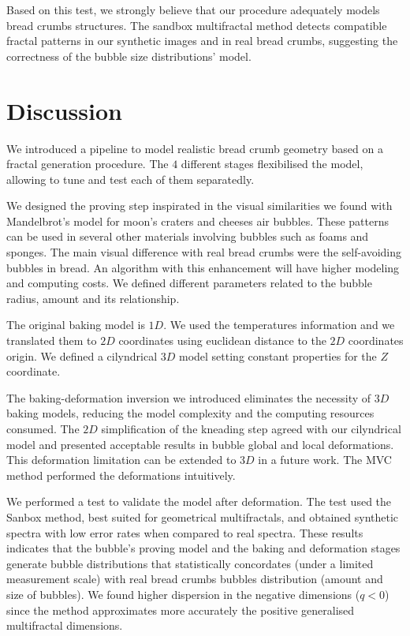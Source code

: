 \documentclass[final,5p,times]{elsarticle}
\begin{document}
{Based on this test, we strongly believe that our procedure adequately models bread crumbs structures. The sandbox multifractal method %
detects compatible fractal patterns in our synthetic images and in real bread crumbs, suggesting the correctness of the bubble size distributions' model.


\section{Discussion}
We introduced a pipeline to model realistic bread crumb geometry based on a fractal generation procedure. The $4$ different stages flexibilised the model, allowing to tune and test each of them separatedly.

We designed the proving step inspirated in the visual similarities we found with Mandelbrot's model for moon's craters and cheeses air bubbles. These patterns can be used in several other materials involving bubbles such as foams and sponges. The main visual difference with real bread crumbs were the self-avoiding bubbles in bread. An algorithm with this enhancement will have higher modeling and computing costs. We defined different parameters related to the bubble radius, amount and its relationship.

The original baking model is $1D$. We used the temperatures information  and we translated them to $2D$ coordinates using euclidean distance to the $2D$ coordinates origin. We defined a cilyndrical $3D$ model setting constant properties for the $Z$ coordinate. 

The baking-deformation inversion we introduced eliminates the necessity of $3D$ baking models, reducing the model complexity and the computing resources consumed. The $2D$ simplification of the kneading step agreed with our cilyndrical model and presented acceptable results in bubble global and local deformations. This  deformation limitation can be extended to $3D$ in a future work. The MVC method performed the deformations intuitively.

We performed a test to validate the model after deformation. The test used the Sanbox method, best suited for geometrical multifractals, and obtained synthetic spectra with low error rates when compared to real spectra. These results indicates that the bubble's proving model and the baking and deformation stages generate bubble distributions that statistically concordates (under a limited measurement scale) with real bread crumbs bubbles distribution (amount and size of bubbles). 
We found higher dispersion in the negative dimensions ($q < 0$) since the method approximates more accurately the positive generalised multifractal dimensions. 

}
\end{document}
